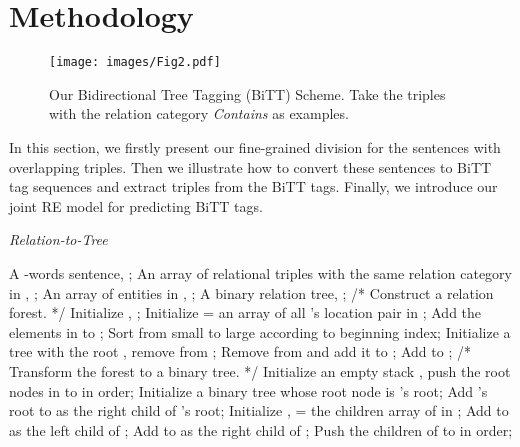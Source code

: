 \documentclass[conference]{IEEEtran}
\begin{document}
%
 \section{Methodology}

\begin{figure*}[t]
    \centering
    \texttt{[image: images/Fig2.pdf]}\\
    \caption{Our Bidirectional Tree Tagging (BiTT) Scheme. Take the triples with the relation category \emph{Contains} as examples.}
    \label{Fig:RelationsTreeTags}
\end{figure*}

In this section, we firstly present our fine-grained division for the sentences with overlapping triples. Then we illustrate how to convert these sentences to BiTT tag sequences and extract triples from the BiTT tags. Finally, we introduce our joint RE model for predicting BiTT tags.

\begin{algorithm}[tb]
    \caption{\emph{Relation-to-Tree}}
    \label{alg:turn}
    \begin{algorithmic}[1]
        \REQUIRE
            A -words sentence, ;
            An array of  relational triples with the same relation category in , ;
            An array of  entities in , ;
        \ENSURE
            A binary relation tree, ;
        \STATE /* Construct a relation forest. */
        \STATE Initialize , ;
            \STATE Initialize  = an array of all 's location pair in ;
            \STATE Add the elements in  to ;
        \ENDFOR
        \STATE Sort  from small to large according to beginning index;
            \STATE Initialize a tree  with the root , remove  from ;
            \FOR {; ; }
                    \STATE Remove  from  and add it to ;
                \ENDIF
            \ENDFOR
            \STATE Add  to ;
        \ENDWHILE
        \STATE /* Transform the forest to a binary tree. */
        \STATE Initialize an empty stack , push the root nodes in  to  in order;
        \STATE Initialize a binary tree  whose root node is 's root;
        \FOR {; ; }
            \STATE Add 's root to  as the right child of 's root;
        \ENDFOR
            \STATE Initialize ,  = the children array of  in ;
            \STATE Add  to  as the left child of ;
            \FOR {; ; }
                \STATE Add  to  as the right child of ;
            \ENDFOR
            \STATE Push the children of  to  in order;
        \ENDWHILE
    \end{algorithmic}
\end{algorithm}
\end{document}
